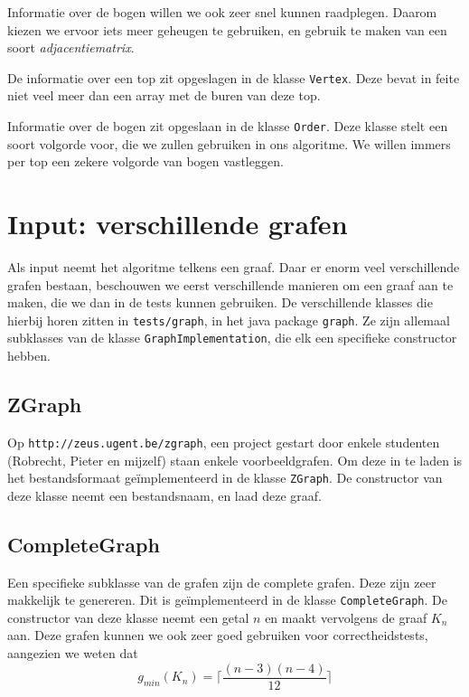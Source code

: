 \documentclass{article}
\begin{document}
Informatie over de bogen willen we ook zeer snel kunnen raadplegen. Daarom
kiezen we ervoor iets meer geheugen te gebruiken, en gebruik te maken van een
soort \emph{adjacentiematrix}.
\newline

De informatie over een top zit opgeslagen in de klasse \verb#Vertex#. Deze bevat
in feite niet veel meer dan een array met de buren van deze top.
\newline

Informatie over de bogen zit opgeslaan in de klasse \verb#Order#. Deze klasse
stelt een soort volgorde voor, die we zullen gebruiken in ons algoritme. We
willen immers per top een zekere volgorde van bogen vastleggen.

\section{Input: verschillende grafen}
Als input neemt het algoritme telkens een graaf. Daar er enorm veel
verschillende grafen bestaan, beschouwen we eerst verschillende manieren om een
graaf aan te maken, die we dan in de tests kunnen gebruiken. De verschillende
klasses die hierbij horen zitten in \verb#tests/graph#, in het java package
\verb#graph#. Ze zijn allemaal subklasses van de klasse
\verb#GraphImplementation#, die elk een specifieke constructor hebben.

\subsection{ZGraph}
Op \verb#http://zeus.ugent.be/zgraph#, een project gestart door enkele studenten
(Robrecht, Pieter en mijzelf) staan enkele voorbeeldgrafen. Om deze in te laden
is het bestandsformaat ge\"implementeerd in de klasse \verb#ZGraph#. De
constructor van deze klasse neemt een bestandsnaam, en laad deze graaf.

\subsection{CompleteGraph}
\label{complete-graph}
Een specifieke subklasse van de grafen zijn de complete grafen. Deze zijn zeer
makkelijk te genereren. Dit is ge\"implementeerd in de klasse
\verb#CompleteGraph#. De constructor van deze klasse neemt een getal $n$ en
maakt vervolgens de graaf $K_n$ aan. Deze grafen kunnen we ook zeer goed
gebruiken voor correctheidstests, aangezien we weten dat
\begin{equation*}
g_{min}(K_n) = \lceil \frac{(n - 3) (n - 4)}{12} \rceil
\end{equation*}
\end{document}
